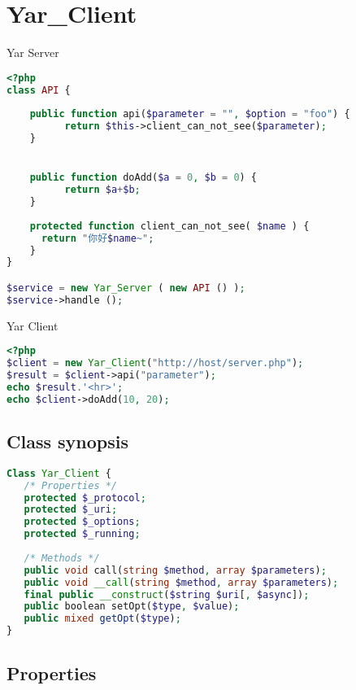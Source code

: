 \chapter{Yar\_Client}

\begin{example}
Yar Server
\begin{lstlisting}[language=PHP]
<?php
class API {
   
    public function api($parameter = "", $option = "foo") {
          return $this->client_can_not_see($parameter);
    }


    public function doAdd($a = 0, $b = 0) {
          return $a+$b;
    }
   
    protected function client_can_not_see( $name ) {
      return "你好$name~";
    }
}

$service = new Yar_Server ( new API () );
$service->handle ();
\end{lstlisting}
\end{example}


\begin{example}
Yar Client
\begin{lstlisting}[language=PHP]
<?php
$client = new Yar_Client("http://host/server.php");
$result = $client->api("parameter");
echo $result.'<hr>';
echo $client->doAdd(10, 20);
\end{lstlisting}
\end{example}



\section{Class synopsis}





\begin{lstlisting}[language=PHP]
Class Yar_Client {
   /* Properties */
   protected $_protocol;
   protected $_uri;
   protected $_options;
   protected $_running;
   
   /* Methods */
   public void call(string $method, array $parameters);
   public void __call(string $method, array $parameters);
   final public __construct($string $uri[, $async]);
   public boolean setOpt($type, $value);
   public mixed getOpt($type);
}
\end{lstlisting}


\section{Properties}



